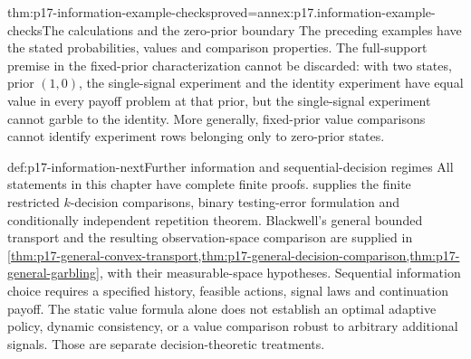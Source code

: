 \begin{hbtheorem}{thm:p17-information-example-checks}{proved=annex:p17.information-example-checks}{The calculations and the zero-prior boundary}
The preceding examples have the stated probabilities, values and
comparison properties.
The full-support premise in the fixed-prior characterization cannot be
discarded: with two states, prior \((1,0)\), the single-signal experiment
and the identity experiment have equal value in every payoff problem at
that prior, but the single-signal experiment cannot garble to the identity.
More generally, fixed-prior value comparisons cannot identify experiment
rows belonging only to zero-prior states.
\end{hbtheorem}

\begin{proofboundary}{def:p17-information-next}{Further information and sequential-decision regimes}
All statements in this chapter have complete finite proofs.
 supplies the finite
restricted \(k\)-decision comparisons, binary testing-error formulation
and conditionally independent repetition theorem.
Blackwell's general bounded transport and the resulting observation-space
comparison are supplied in
\cref{thm:p17-general-convex-transport,thm:p17-general-decision-comparison,thm:p17-general-garbling}, with their measurable-space hypotheses.
Sequential information choice requires a
specified history, feasible actions, signal laws and continuation payoff.
The static value formula alone does not establish an optimal adaptive policy,
dynamic consistency, or a value comparison robust to arbitrary additional
signals. Those are separate decision-theoretic treatments.
\end{proofboundary}
